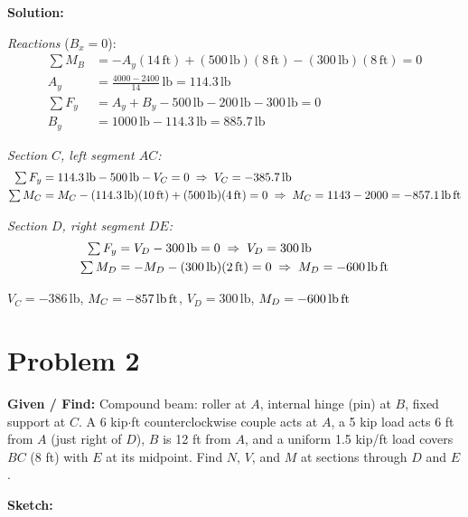 \documentclass[11pt]{article}
\newcommand{\un}[1]{\,\text{#1}}
\begin{document}
\textbf{Solution:}

\textit{Reactions} ($B_x = 0$):
\begin{align*}
\textstyle\sum M_B &= -A_y(14\un{ft}) + (500\un{lb})(8\un{ft}) - (300\un{lb})(8\un{ft}) = 0\\
A_y &= \frac{4000 - 2400}{14}\un{lb} = 114.3\un{lb}\\[4pt]
\textstyle\sum F_y &= A_y + B_y - 500\un{lb} - 200\un{lb} - 300\un{lb} = 0\\
B_y &= 1000\un{lb} - 114.3\un{lb} = 885.7\un{lb}
\end{align*}

\textit{Section $C$, left segment $AC$:}
\begin{align*}
\textstyle\sum F_y &= 114.3\un{lb} - 500\un{lb} - V_C = 0 \;\Rightarrow\; V_C = -385.7\un{lb}\\
\textstyle\sum M_C &= M_C - (114.3\un{lb})(10\un{ft}) + (500\un{lb})(4\un{ft}) = 0 \;\Rightarrow\; M_C = 1143 - 2000 = -857.1\un{lb\,ft}
\end{align*}

\textit{Section $D$, right segment $DE$:}
\begin{align*}
\textstyle\sum F_y &= V_D - 300\un{lb} = 0 \;\Rightarrow\; V_D = 300\un{lb}\\
\textstyle\sum M_D &= -M_D - (300\un{lb})(2\un{ft}) = 0 \;\Rightarrow\; M_D = -600\un{lb\,ft}
\end{align*}

\begin{finalanswer}
$V_C = -386\un{lb}$, \quad $M_C = -857\un{lb\,ft}$, \qquad $V_D = 300\un{lb}$, \quad $M_D = -600\un{lb\,ft}$
\end{finalanswer}

\clearpage
\section*{Problem 2}

\textbf{Given / Find:} Compound beam: roller at $A$, internal hinge (pin) at $B$, fixed support at $C$. A 6 kip$\cdot$ft counterclockwise couple acts at $A$, a 5 kip load acts 6 ft from $A$ (just right of $D$), $B$ is 12 ft from $A$, and a uniform 1.5 kip/ft load covers $BC$ (8 ft) with $E$ at its midpoint. Find $N$, $V$, and $M$ at sections through $D$ and $E$.

\textbf{Sketch:}
\end{document}
